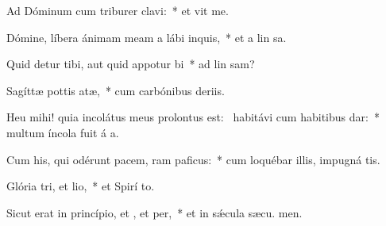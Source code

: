 \item Ad Dóminum cum triburer clavi:~* et vit me.
\item Dómine, líbera ánimam meam a lábi inquis,~* et a lin sa.
\item Quid detur tibi, aut quid appotur bi~* ad lin sam?
\item Sagíttæ pottis atæ,~* cum carbónibus deriis.
\item Heu mihi! quia incolátus meus prolontus est:~\pscross{} habitávi cum habitibus dar:~* multum íncola fuit á a.
\item Cum his, qui odérunt pacem, ram paficus:~* cum loquébar illis, impugná  tis.
\item Glória tri, et lio,~* et Spirí to.
\item Sicut erat in princípio, et , et per,~* et in sǽcula sæcu. men.
